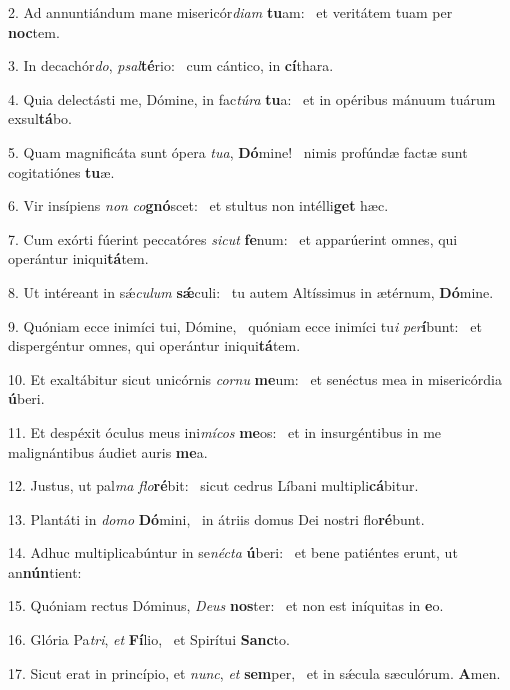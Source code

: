 2. Ad annuntiándum mane misericór\textit{di}\textit{am} \textbf{tu}am: \ast\  et veritátem tuam per \textbf{noc}tem.\

3. In decachór\textit{do}, \textit{psal}\textbf{té}rio: \ast\  cum cántico, in \textbf{cí}thara.\

4. Quia delectásti me, Dómine, in fac\textit{tú}\textit{ra} \textbf{tu}a: \ast\  et in opéribus mánuum tuárum exsul\textbf{tá}bo.\

5. Quam magnificáta sunt ópera \textit{tu}\textit{a}, \textbf{Dó}mine! \ast\  nimis profúndæ factæ sunt cogitatiónes \textbf{tu}æ.\

6. Vir insípiens \textit{non} \textit{co}\textbf{gnó}scet: \ast\  et stultus non intélli\textbf{get} hæc.\

7. Cum exórti fúerint peccatóres \textit{sic}\textit{ut} \textbf{fe}num: \ast\  et apparúerint omnes, qui operántur iniqui\textbf{tá}tem.\

8. Ut intéreant in sǽ\textit{cu}\textit{lum} \textbf{sǽ}culi: \ast\  tu autem Altíssimus in ætérnum, \textbf{Dó}mine.\

9. Quóniam ecce inimíci tui, Dómine, \dag\  quóniam ecce inimíci tu\textit{i} \textit{per}\textbf{í}bunt: \ast\  et dispergéntur omnes, qui operántur iniqui\textbf{tá}tem.\

10. Et exaltábitur sicut unicórnis \textit{cor}\textit{nu} \textbf{me}um: \ast\  et senéctus mea in misericórdia \textbf{ú}beri.\

11. Et despéxit óculus meus ini\textit{mí}\textit{cos} \textbf{me}os: \ast\  et in insurgéntibus in me malignántibus áudiet auris \textbf{me}a.\

12. Justus, ut pal\textit{ma} \textit{flo}\textbf{ré}bit: \ast\  sicut cedrus Líbani multipli\textbf{cá}bitur.\

13. Plantáti in \textit{do}\textit{mo} \textbf{Dó}mini, \ast\  in átriis domus Dei nostri flo\textbf{ré}bunt.\

14. Adhuc multiplicabúntur in se\textit{néc}\textit{ta} \textbf{ú}beri: \ast\  et bene patiéntes erunt, ut an\textbf{nún}tient:\

15. Quóniam rectus Dóminus, \textit{De}\textit{us} \textbf{nos}ter: \ast\  et non est iníquitas in \textbf{e}o.\

16. Glória Pa\textit{tri}, \textit{et} \textbf{Fí}lio, \ast\  et Spirítui \textbf{Sanc}to.\

17. Sicut erat in princípio, et \textit{nunc}, \textit{et} \textbf{sem}per, \ast\  et in sǽcula sæculórum. \textbf{A}men.\

